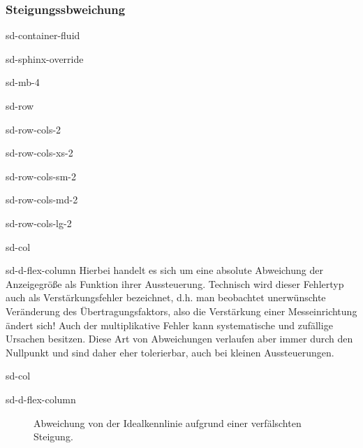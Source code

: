 \documentclass[letterpaper,10pt,english]{jupyterBook}
\let\sphinxpxdimen\pdfpxdimen\else\newdimen\sphinxpxdimen
\begin{document}
\subsubsection{Steigungssbweichung}
\label{\detokenize{content/2_realeKennlinie:steigungssbweichung}}
\begin{sphinxuseclass}{sd-container-fluid}
\begin{sphinxuseclass}{sd-sphinx-override}
\begin{sphinxuseclass}{sd-mb-4}
\begin{sphinxuseclass}{sd-row}
\begin{sphinxuseclass}{sd-row-cols-2}
\begin{sphinxuseclass}{sd-row-cols-xs-2}
\begin{sphinxuseclass}{sd-row-cols-sm-2}
\begin{sphinxuseclass}{sd-row-cols-md-2}
\begin{sphinxuseclass}{sd-row-cols-lg-2}
\begin{sphinxuseclass}{sd-col}
\begin{sphinxuseclass}{sd-d-flex-column}
\sphinxAtStartPar
Hierbei handelt es sich um eine absolute Abweichung der Anzeigegröße als Funktion ihrer Aussteuerung. Technisch wird dieser Fehlertyp auch als Verstärkungsfehler bezeichnet, d.h. man beobachtet unerwünschte Veränderung des Übertragungsfaktors, also die Verstärkung einer Messeinrichtung ändert sich! Auch der multiplikative Fehler kann systematische und zufällige Ursachen besitzen. Diese Art von Abweichungen verlaufen aber immer durch den Nullpunkt und sind daher eher tolerierbar, auch bei kleinen Aussteuerungen.

\end{sphinxuseclass}
\end{sphinxuseclass}
\begin{sphinxuseclass}{sd-col}
\begin{sphinxuseclass}{sd-d-flex-column}
\begin{figure}[htbp]
\centering
\capstart

\noindent\sphinxincludegraphics[width=200\sphinxpxdimen]{{steigungsabw}.jpg}
\caption{Abweichung von der Idealkennlinie aufgrund einer verfälschten Steigung.}\label{\detokenize{content/2_realeKennlinie:steigungsabw}}\end{figure}

\end{sphinxuseclass}
\end{sphinxuseclass}
\end{sphinxuseclass}
\end{sphinxuseclass}
\end{sphinxuseclass}
\end{sphinxuseclass}
\end{sphinxuseclass}
\end{sphinxuseclass}
\end{sphinxuseclass}
\end{sphinxuseclass}
\end{sphinxuseclass}
\end{document}
